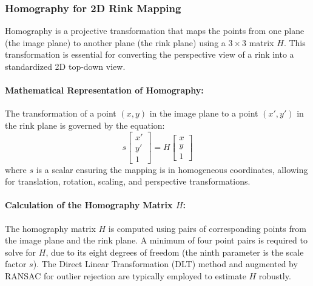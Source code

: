 \documentclass[12pt, letterpaper]{article}
\begin{document}
{\begin{spacing}{1.2}
\subsubsection{Homography for 2D Rink Mapping}
Homography is a projective transformation that maps the points from one plane (the image plane) to another plane (the rink plane) using a \(3 \times 3\) matrix \(H\). This transformation is essential for converting the perspective view of a rink into a standardized 2D top-down view.

\paragraph{Mathematical Representation of Homography:}
The transformation of a point \((x, y)\) in the image plane to a point \((x', y')\) in the rink plane is governed by the equation:
\begin{equation}
    s \begin{bmatrix} x' \\ y' \\ 1 \end{bmatrix} = H \begin{bmatrix} x \\ y \\ 1 \end{bmatrix}
\end{equation}
where \(s\) is a scalar ensuring the mapping is in homogeneous coordinates, allowing for translation, rotation, scaling, and perspective transformations.


\paragraph{Calculation of the Homography Matrix \(H\):}
The homography matrix \(H\) is computed using pairs of corresponding points from the image plane and the rink plane. A minimum of four point pairs is required to solve for \(H\), due to its eight degrees of freedom (the ninth parameter is the scale factor \(s\)). The Direct Linear Transformation (DLT) method and augmented by RANSAC for outlier rejection are typically employed to estimate \(H\) robustly.




\end{spacing}}
\end{document}
